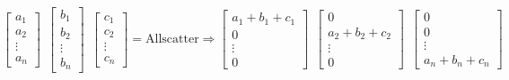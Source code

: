 \documentclass[10pt, letterpaper]{report}
\begin{document}
$$ 
\begin{bmatrix}
    a_1 \\ a_2 \\ \vdots\\ a_n
\end{bmatrix} \ \ 
\begin{bmatrix}
    b_1 \\ b_2 \\ \vdots\\  b_n
\end{bmatrix}\ \ 
\begin{bmatrix}
    c_1 \\ c_2 \\ \vdots\\  c_n
\end{bmatrix} =\text{Allscatter}\Rightarrow
\begin{bmatrix}
    a_1+b_1+c_1 \\ 0\\ \vdots\\ 0
\end{bmatrix} \ \ 
\begin{bmatrix}
    0 \\ a_2+b_2+c_2 \\ \vdots\\  0
\end{bmatrix}\ \ 
\begin{bmatrix}
    0 \\ 0 \\ \vdots\\  a_n+b_n+c_n
\end{bmatrix} 
$$\flowerLine
\end{document}
